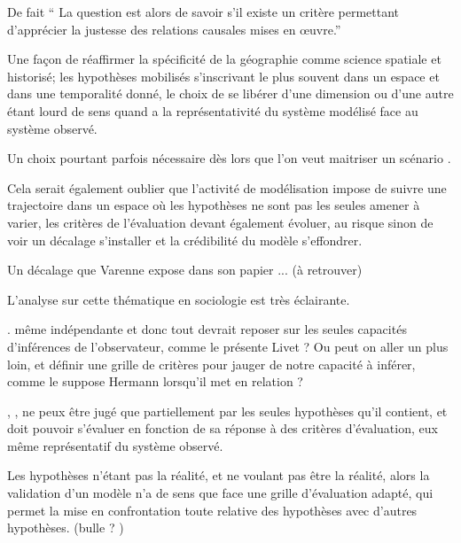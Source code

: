 De fait \enquote{ La question est alors de savoir s’il existe un critère permettant d’apprécier la justesse des relations causales mises en œuvre.} \autocite{Bulle2005}








Une façon de réaffirmer la spécificité de la géographie comme science spatiale et historisé; les hypothèses mobilisés s'inscrivant le plus souvent dans un espace et dans une temporalité donné, le choix de se libérer d'une dimension ou d'une autre étant lourd de sens quand a la représentativité du système modélisé face au système observé.

Un choix pourtant parfois nécessaire dès lors que l'on veut maitriser un scénario . 

Cela serait également oublier que l'activité de modélisation impose de suivre une trajectoire dans un espace où les hypothèses ne sont pas les seules amener à varier, les critères de l'évaluation devant également évoluer, au risque sinon de voir un décalage s'installer et la crédibilité du modèle s'effondrer.



Un décalage que Varenne expose dans son papier ... (à retrouver)


L'analyse \textcite{Bulle2005} sur cette thématique en sociologie est très éclairante. 


. même indépendante et donc tout devrait reposer sur les seules capacités d'inférences de l'observateur, comme le présente Livet ? Ou peut on aller un plus loin, et définir une grille de critères pour jauger de notre capacité à inférer, comme le suppose Hermann lorsqu'il met en relation  ? 

, , ne peux être jugé que partiellement par les seules hypothèses qu'il contient, et doit pouvoir s'évaluer en fonction de sa réponse à des critères d'évaluation, eux même représentatif du système observé.

Les hypothèses n'étant pas la réalité, et ne voulant pas être la réalité, alors la validation d'un modèle n'a de sens que face une grille d'évaluation adapté, qui permet la mise en confrontation toute relative des hypothèses avec d'autres hypothèses. (bulle ? )


